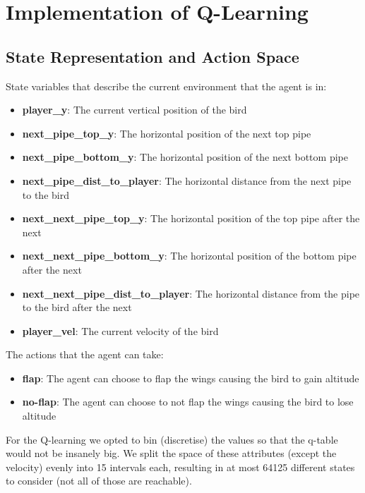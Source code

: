 \documentclass[a4paper,12pt]{article}
\begin{document}
\section{Implementation of Q-Learning}
\subsection{State Representation and Action Space}

\noindent State variables that describe the current environment that the agent is in:
\begin{itemize}
    \item \textbf{player\_y}: The current vertical position of the bird
    \item \textbf{next\_pipe\_top\_y}: The horizontal position of the next top pipe
    \item \textbf{next\_pipe\_bottom\_y}: The horizontal position of the next bottom pipe
    \item \textbf{next\_pipe\_dist\_to\_player}: The horizontal distance from the next pipe to the bird
    \item \textbf{next\_next\_pipe\_top\_y}: The horizontal position of the top pipe after the next
    \item \textbf{next\_next\_pipe\_bottom\_y}: The horizontal position of the bottom pipe after the next
    \item \textbf{next\_next\_pipe\_dist\_to\_player}: The horizontal distance from the pipe to the bird after the next
    \item \textbf{player\_vel}: The current velocity of the bird
\end{itemize}

\noindent The actions that the agent can take:
\begin{itemize}
    \item \textbf{flap}: The agent can choose to flap the wings causing the bird to gain altitude
    \item \textbf{no-flap}: The agent can choose to not flap the wings causing the bird to lose altitude
\end{itemize}

\noindent For the Q-learning we opted to bin (discretise) the values so that the q-table would not be insanely big. We split the space of these attributes (except the velocity) evenly
into 15 intervals each, resulting in at most 64125 different states to consider (not all of those are reachable).
\end{document}
